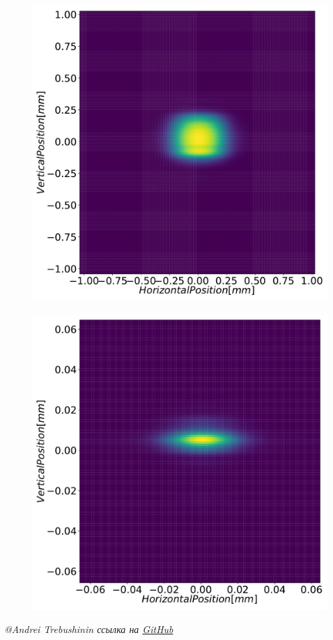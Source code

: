\documentclass[14pt, hyperref = {colorlinks},xcolor=table ]{beamer}
\begin{document}
\begin{frame}
\begin{figure}[h]
\begin{minipage}[h]{0.32\linewidth}
		\raggedright{\includegraphics[width=0.99\linewidth]{pic/3_harm_after_DCM_2d.pdf}}
	\end{minipage}
	\begin{minipage}[h]{0.32\linewidth}
		\raggedright{\includegraphics[width=0.99\linewidth]{pic/3_harm_after_Sph_Mir_2d.pdf}}
	\end{minipage}
\end{figure}

\vspace{0pt}	
\tiny{\textit{@Andrei Trebushinin ссылка на \href{https://github.com/TrebAndrew/thesis_andrei.git}{GitHub}}}
\end{frame}
\end{document}
